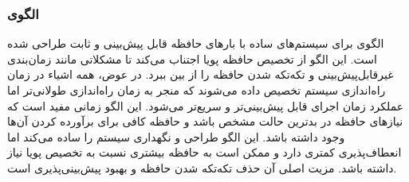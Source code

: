 \subsubsection{الگوی }
\label{memStaticAllocSec}
\begin{RTL}
الگوی  برای سیستم‌های ساده
با بارهای حافظه قابل پیش‌بینی و ثابت طراحی شده است.
این الگو از تخصیص حافظه پویا اجتناب می‌کند تا مشکلاتی مانند زمان‌بندی
غیرقابل‌پیش‌بینی و تکه‌تکه شدن حافظه را از بین ببرد. در عوض، همه اشیاء
در زمان راه‌اندازی سیستم تخصیص داده می‌شوند که منجر به زمان راه‌اندازی
طولانی‌تر اما عملکرد زمان اجرای قابل پیش‌بینی‌تر و سریع‌تر می‌شود.
این الگو زمانی مفید است که نیازهای حافظه در بدترین حالت مشخص باشد
و حافظه کافی برای برآورده کردن آن‌ها وجود داشته باشد.
این الگو طراحی و نگهداری سیستم را ساده می‌کند اما انعطاف‌پذیری کمتری دارد
و ممکن است به حافظه بیشتری نسبت به تخصیص پویا نیاز داشته باشد.
مزیت اصلی آن حذف تکه‌تکه شدن حافظه و بهبود پیش‌بینی‌پذیری است.
\end{RTL}